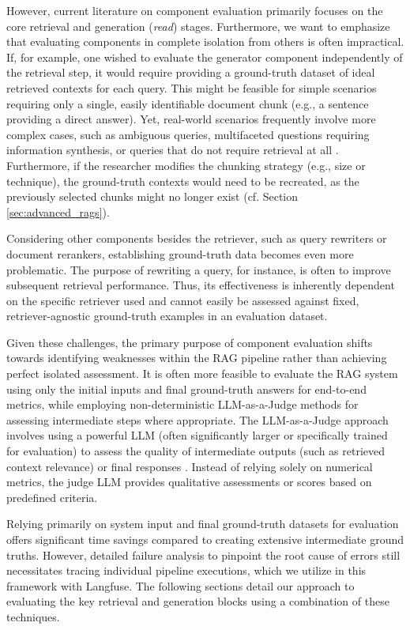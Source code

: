 However, current literature on component evaluation primarily focuses on the core retrieval and generation (\textit{read}) stages. Furthermore, we want to emphasize that evaluating components in complete isolation from others is often impractical. If, for example, one wished to evaluate the generator component independently of the retrieval step, it would require providing a ground-truth dataset of ideal retrieved contexts for each query. This might be feasible for simple scenarios requiring only a single, easily identifiable document chunk (e.g., a sentence providing a direct answer). Yet, real-world scenarios frequently involve more complex cases, such as ambiguous queries, multifaceted questions requiring information synthesis, or queries that do not require retrieval at all \cite{Huang_2023}. Furthermore, if the researcher modifies the chunking strategy (e.g., size or technique), the ground-truth contexts would need to be recreated, as the previously selected chunks might no longer exist (cf. Section \ref{sec:advanced_rags}).

Considering other components besides the retriever, such as query rewriters or document rerankers, establishing ground-truth data becomes even more problematic. The purpose of rewriting a query, for instance, is often to improve subsequent retrieval performance. Thus, its effectiveness is inherently dependent on the specific retriever used and cannot easily be assessed against fixed, retriever-agnostic ground-truth examples in an evaluation dataset.

Given these challenges, the primary purpose of component evaluation shifts towards identifying weaknesses within the RAG pipeline rather than achieving perfect isolated assessment. It is often more feasible to evaluate the RAG system using only the initial inputs and final ground-truth answers for end-to-end metrics, while employing non-deterministic LLM-as-a-Judge methods for assessing intermediate steps where appropriate. The LLM-as-a-Judge approach involves using a powerful LLM (often significantly larger or specifically trained for evaluation) to assess the quality of intermediate outputs (such as retrieved context relevance) or final responses \cite{Chiang.2023}. Instead of relying solely on numerical metrics, the judge LLM provides qualitative assessments or scores based on predefined criteria.

Relying primarily on system input and final ground-truth datasets for evaluation offers significant time savings compared to creating extensive intermediate ground truths. However, detailed failure analysis to pinpoint the root cause of errors still necessitates tracing individual pipeline executions, which we utilize in this framework with Langfuse. The following sections detail our approach to evaluating the key retrieval and generation blocks using a combination of these techniques.

